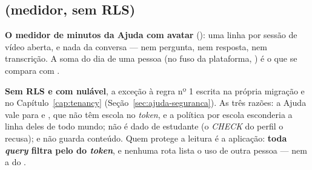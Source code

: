 \subsection{ (medidor, sem RLS)}

\textbf{O medidor de minutos da Ajuda com avatar} (): uma linha
por sessão de vídeo aberta, e nada da conversa --- nem pergunta, nem resposta,
nem transcrição. A soma do dia de uma pessoa (no fuso da plataforma,
) é o que se compara com .

\textbf{Sem RLS e com  nulável}, a exceção à regra nº 1 escrita na
própria migração e no Capítulo~\ref{cap:tenancy}
(Seção~\ref{sec:ajuda-seguranca}). As três razões: a Ajuda vale para
 e , que não têm escola no \emph{token}, e a
política por escola esconderia a linha deles de todo mundo; não é dado de
estudante (o \emph{CHECK} do perfil o recusa); e não guarda conteúdo. Quem
protege a leitura é a aplicação: \textbf{toda \emph{query} filtra pelo
 do \emph{token}}, e nenhuma rota lista o uso de outra pessoa ---
nem a do .

